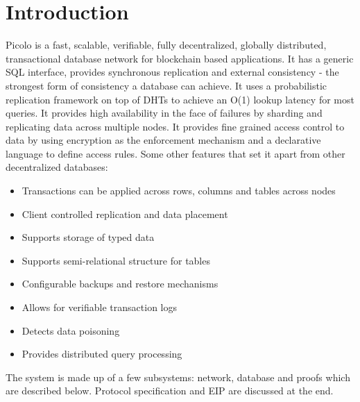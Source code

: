 \documentclass[preprint,12pt]{elsarticle}
\begin{document}
\section{Introduction}\label{Sect:Introduction}
Picolo is a fast, scalable, verifiable, fully decentralized, globally distributed, transactional database network for
blockchain based applications. It has a generic SQL interface, provides synchronous replication and external consistency - the strongest form of consistency a database can achieve. It uses a probabilistic replication framework on top of DHTs to achieve an O(1) lookup latency for most queries. It provides high availability in the face of failures by sharding and replicating data across multiple nodes. It provides fine grained access control to data by using encryption as the enforcement mechanism and a declarative language to define access rules. Some other features that set it apart from other decentralized databases:
\begin{itemize}
    \item Transactions can be applied across rows, columns and tables across nodes
    \item Client controlled replication and data placement
    \item Supports storage of typed data
    \item Supports semi-relational structure for tables
    \item Configurable backups and restore mechanisms
   	\item Allows for verifiable transaction logs
   	\item Detects data poisoning
   	\item Provides distributed query processing
\end{itemize}
The system is made up of a few subsystems: network, database and proofs which are described below. Protocol specification and EIP are discussed at the end.

\end{document}
